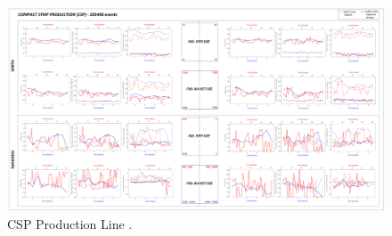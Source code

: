 \begin{landscape}
\begin{figure}[ht]
	\centering
	\includegraphics[width=1.35\textwidth]{../images/supplements-CSP_real_life_events_analysis-results-curves_and_time_resolutions.png}
	\caption{CSP Production Line \cc{} \dd{}.}
	\label{figure-supplements-CSP-curveplots_sliding}
\end{figure}
\end{landscape}